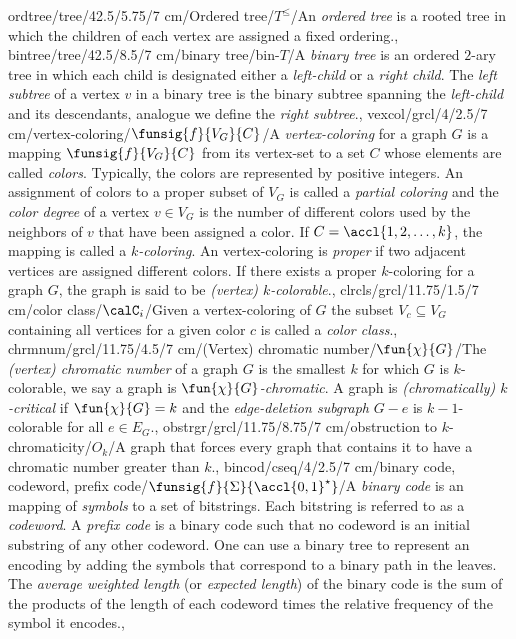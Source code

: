 ordtree/tree/42.5/5.75/7 cm/{Ordered tree}/{$T^{\leq}$}/{An \emph{ordered tree} is a rooted tree in which the children of each vertex are assigned a fixed ordering.},%
bintree/tree/42.5/8.5/7 cm/{binary tree}/{bin-$T$}/{A \emph{binary tree} is an ordered $2$-ary tree in which each child is designated either a \emph{left-child} or a \emph{right child}. The \emph{left subtree} of a vertex $v$ in a binary tree is the binary
 subtree spanning the \emph{left-child} and its descendants, analogue we define the \emph{right subtree}.},%
vexcol/grcl/4/2.5/7 cm/{vertex-coloring}/{$\funsig{f}{V_G}{C}$}/{A \emph{vertex-coloring} for a graph $G$ is a mapping $\funsig{f}{V_G}{C}$ from its vertex-set to a set $C$ whose elements are called \emph{colors}. Typically, the colors are represented by positive integers. An assignment of colors to a proper subset of $V_G$ is called a \emph{partial coloring} and the \emph{color degree} of a vertex $v\in V_G$ is the number of different colors used by the neighbors of $v$ that have been assigned a color. If $C=\accl{1,2,\ldots,k}$, the mapping is called a \emph{$k$-coloring}. An vertex-coloring is \emph{proper} if two adjacent vertices are assigned different colors. If there exists a proper $k$-coloring for a graph $G$, the graph is said to be \emph{(vertex) $k$-colorable}.},
clrcls/grcl/11.75/1.5/7 cm/{color class}/{$\calC_i$}/{Given a vertex-coloring of $G$ the subset $V_c\subseteq V_G$ containing all vertices for a given color $c$ is called a \emph{color class}.},
chrmnum/grcl/11.75/4.5/7 cm/{(Vertex) chromatic number}/{$\fun{\chi}{G}$}/{The \emph{(vertex) chromatic number} of a graph $G$ is the smallest $k$ for which $G$ is $k$-colorable, we say a graph is \emph{$\fun{\chi}{G}$-chromatic}. A graph is \emph{(chromatically) $k$-critical} if $\fun{\chi}{G}=k$ and the \emph{edge-deletion subgraph} $G-e$ is $k-1$-colorable for all $e\in E_G$.},
obstrgr/grcl/11.75/8.75/7 cm/{obstruction to $k$-chromaticity}/{$O_k$}/{A graph that forces every graph that contains it to have a chromatic number greater than $k$.},
bincod/cseq/4/2.5/7 cm/{binary code, codeword, prefix code}/{$\funsig{f}{\Sigma}{\accl{0,1}^{\star}}$}/{A \emph{binary code} is an mapping of \emph{symbols} to a set of bitstrings. Each bitstring is referred to as a \emph{codeword}. A \emph{prefix code} is a binary code such that no codeword is an initial substring of any other codeword. One can use a binary tree to represent an encoding by adding the symbols that correspond to a binary path in the leaves. The \emph{average weighted length} (or \emph{expected length}) of the binary code is the sum of the products of the length of each codeword times the relative frequency of the symbol it encodes.},
